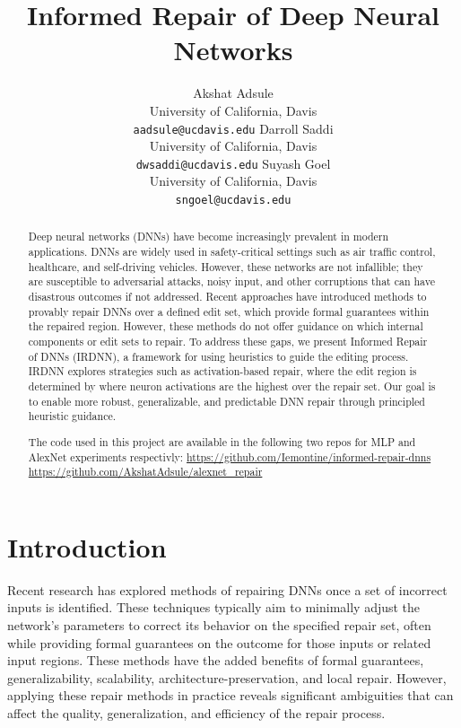 \documentclass{article}
\title{Informed Repair of Deep Neural Networks}
\begin{document}
\author{
	Akshat Adsule \\
	University of California, Davis \\
	\texttt{aadsule@ucdavis.edu}
	\And
	Darroll Saddi \\
	University of California, Davis \\
	\texttt{dwsaddi@ucdavis.edu}
	\And
	Suyash Goel \\
	University of California, Davis \\
	\texttt{sngoel@ucdavis.edu}
}

\maketitle

\begin{abstract}
	Deep neural networks (DNNs) have become increasingly prevalent in modern applications.
	DNNs are widely used in safety-critical settings such as air traffic control, healthcare, and self-driving vehicles.
	However, these networks are not infallible; they are susceptible to adversarial attacks, noisy input, and other corruptions that can have disastrous outcomes if not addressed.
	Recent approaches have introduced methods to provably repair DNNs over a defined edit set, which provide formal guarantees within the repaired region.
	However, these methods do not offer guidance on which internal components or edit sets to repair.
	To address these gaps, we present Informed Repair of DNNs (IRDNN), a framework for using heuristics to guide the editing process.
	IRDNN explores strategies such as activation-based repair, where the edit region is determined by where neuron activations are the highest over the repair set.
	Our goal is to enable more robust, generalizable, and predictable DNN repair through principled heuristic guidance.

	The code used in this project are available in the following two repos for MLP and AlexNet experiments respectivly:
	\url{https://github.com/Iemontine/informed-repair-dnns}
	\url{https://github.com/AkshatAdsule/alexnet_repair}
\end{abstract}

\section{Introduction}

Recent research \citep{nawas_provable_2024, sotoudeh_provable_2021, tao_architecture-preserving_2023} has explored methods of repairing DNNs once a set of incorrect inputs is identified.
These techniques typically aim to minimally adjust the network's parameters to correct its behavior on the specified repair set, often while providing formal guarantees on the outcome for those inputs or related input regions.
These methods have the added benefits of formal guarantees, generalizability, scalability, architecture-preservation, and local repair.
However, applying these repair methods in practice reveals significant ambiguities that can affect the quality, generalization, and efficiency of the repair process.
\end{document}
